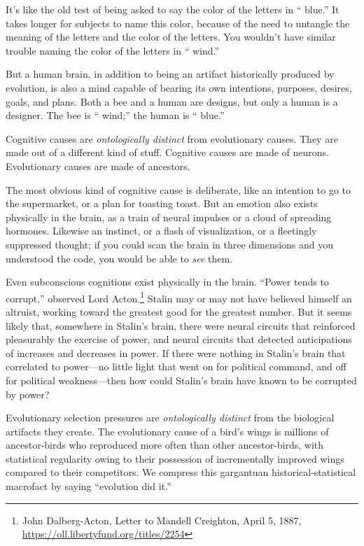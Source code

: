 {{
 It's like the old test of being asked to say the
color of the letters in ``{\color{red} blue}.'' It
takes longer for subjects to name this color, because of the need to
untangle the meaning of the letters and the color of the letters. You
wouldn't have similar trouble naming the color of the
letters in ``{\color{green} wind}.''}

{
 But a human brain, in addition to being an artifact historically
produced by evolution, is also a mind capable of bearing its own
intentions, purposes, desires, goals, and plans. Both a bee and a human
are designs, but only a human is a designer. The bee is
``{\color{green} wind};'' the human is
``{\color{red} blue}.''}

{
 Cognitive causes are \textit{ontologically distinct} from
evolutionary causes. They are made out of a different kind of stuff.
Cognitive causes are made of neurons. Evolutionary causes are made of
ancestors.}

{
 The most obvious kind of cognitive cause is deliberate, like an
intention to go to the supermarket, or a plan for toasting toast. But
an emotion also exists physically in the brain, as a train of neural
impulses or a cloud of spreading hormones. Likewise an instinct, or a
flash of visualization, or a fleetingly suppressed thought; if you
could scan the brain in three dimensions and you understood the code,
you would be able to \textit{see} them.}

{
 Even subconscious cognitions exist physically in the brain.
``Power tends to corrupt,'' observed
Lord Acton.\footnote{John Dalberg-Acton, Letter to Mandell Creighton, April 5, 1887, \url{https://oll.libertyfund.org/titles/2254}} Stalin may or may not have believed himself an altruist,
working toward the greatest good for the greatest number. But it seems
likely that, somewhere in Stalin's brain, there were
neural circuits that reinforced pleasurably the exercise of power, and
neural circuits that detected anticipations of increases and decreases
in power. If there were nothing in Stalin's brain that
correlated to power---no little light that went on for political
command, and off for political weakness---then how could
Stalin's brain have known to be corrupted by power?}

{
 Evolutionary selection pressures are \textit{ontologically
distinct} from the biological artifacts they create. The evolutionary
cause of a bird's wings is millions of ancestor-birds
who reproduced more often than other ancestor-birds, with statistical
regularity owing to their possession of incrementally improved wings
compared to their competitors. We compress this gargantuan
historical-statistical macrofact by saying ``evolution
did it.''}

}
